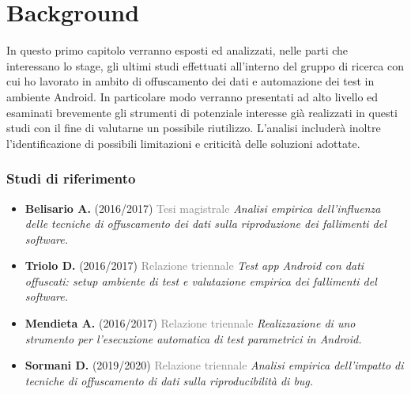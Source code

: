 \chapter{Background}
\label{background}
\rhead{}

In questo primo capitolo verranno esposti ed analizzati, nelle parti che interessano lo stage, gli ultimi studi effettuati all'interno del gruppo di ricerca con cui ho lavorato in ambito di offuscamento dei dati e automazione dei test in ambiente Android. In particolare modo verranno presentati ad alto livello ed esaminati brevemente gli strumenti di potenziale interesse già realizzati in questi studi con il fine di valutarne un possibile riutilizzo. L'analisi  includerà inoltre l'identificazione di possibili limitazioni e criticità  delle soluzioni adottate. %

\subsection*{Studi di riferimento}
\begin{itemize}[nosep]
\item \textbf{Belisario A.} (2016/2017) \textcolor{gray}{Tesi magistrale}
\newline \emph{Analisi empirica dell'influenza delle tecniche di offuscamento dei dati sulla riproduzione dei fallimenti del software.} 

\item  \textbf{Triolo D.} (2016/2017)  \textcolor{gray}{Relazione triennale}
\newline \emph{Test app Android con dati offuscati: setup ambiente di test e valutazione empirica dei fallimenti del software.}

\item  \textbf{Mendieta A.} (2016/2017)   \textcolor{gray}{Relazione triennale}
\newline \emph{Realizzazione di uno strumento per l’esecuzione automatica di test parametrici in Android.}

\item  \textbf{Sormani D.} (2019/2020) \textcolor{gray}{Relazione triennale}
\newline \emph{Analisi empirica dell’impatto di tecniche di offuscamento di dati sulla riproducibilità di bug.}
\end{itemize}
\newpage
